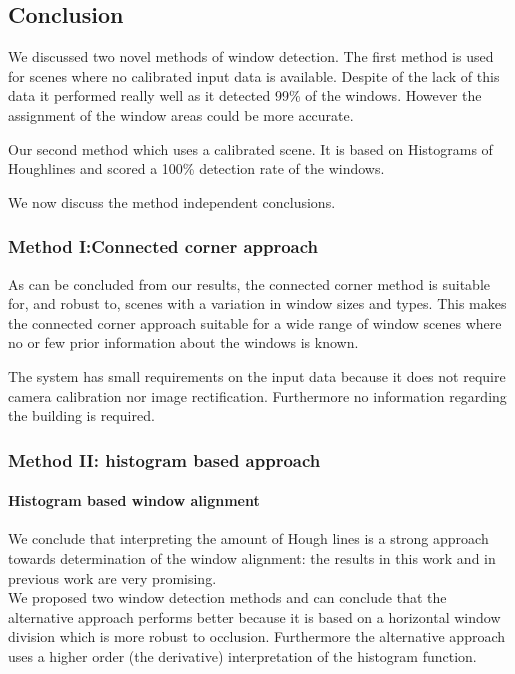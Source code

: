 \subsection{Conclusion}

We discussed two novel methods of window detection. The first method is used for
scenes where no calibrated input data is available. Despite of the lack of this
data it performed really well as it detected 99\% of the windows. However the 
assignment of the window areas could be more accurate.  

Our second method which uses a calibrated scene.  It is based on Histograms
of Houghlines and scored a 100\% detection rate of the windows.  

We now discuss the method independent conclusions.  

\subsubsection{Method I:Connected corner approach} %
As can be concluded from our results, the connected corner method is suitable
for, and robust to, scenes with a variation in window sizes and types. This
	makes the connected corner approach suitable for a wide range of window
	scenes where no or few prior information about the windows is known.

The system has small requirements on the input data because it does not require
camera calibration nor image rectification.  Furthermore no information
regarding the building is required.


\subsubsection{Method II: histogram based approach}
\paragraph{Histogram based window alignment}
We conclude that interpreting the amount of Hough lines is a strong approach
towards determination of the window alignment: the
results in this work and in previous work are very promising.\\

We proposed two window detection methods and can conclude that the alternative
approach performs better because it is based on a horizontal window division
which is more robust to occlusion. Furthermore the alternative approach uses a
higher order (the derivative) interpretation of the histogram function.\\

